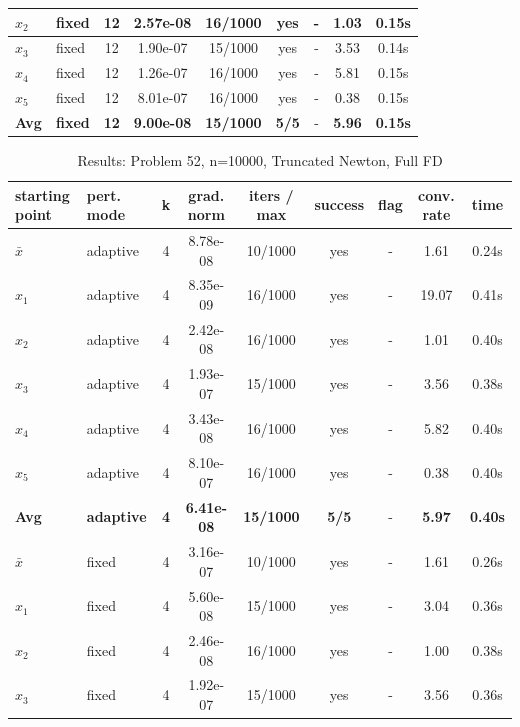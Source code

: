 \begin{longtable}{|l|l|c|c|c|c|c|c|c|}
\hline
$x_2$ & fixed & 12 & 2.57e-08 & 16/1000 & yes & - & 1.03 & 0.15s \\
\hline
$x_3$ & fixed & 12 & 1.90e-07 & 15/1000 & yes & - & 3.53 & 0.14s \\
\hline
$x_4$ & fixed & 12 & 1.26e-07 & 16/1000 & yes & - & 5.81 & 0.15s \\
\hline
$x_5$ & fixed & 12 & 8.01e-07 & 16/1000 & yes & - & 0.38 & 0.15s \\
\hline
\hline\hline
\textbf{Avg} & \textbf{fixed} & \textbf{12} & \textbf{9.00e-08} & \textbf{15/1000} & \textbf{5/5} & - & \textbf{5.96} & \textbf{0.15s} \\
\hline\hline
\end{longtable}


\begin{longtable}{|l|l|c|c|c|c|c|c|c|}
\caption{Results: Problem 52, n=10000, Truncated Newton, Full FD} \\
\hline
\textbf{starting point} & \textbf{pert. mode} & \textbf{k} & \textbf{grad. norm} & \textbf{iters / max} & \textbf{success} & \textbf{flag} & \textbf{conv. rate} & \textbf{time} \\
\hline
\endfirsthead
\endhead
\endfoot
\hline
\endlastfoot
$\bar{x}$ & adaptive & 4 & 8.78e-08 & 10/1000 & yes & - & 1.61 & 0.24s \\
\hline
$x_1$ & adaptive & 4 & 8.35e-09 & 16/1000 & yes & - & 19.07 & 0.41s \\
\hline
$x_2$ & adaptive & 4 & 2.42e-08 & 16/1000 & yes & - & 1.01 & 0.40s \\
\hline
$x_3$ & adaptive & 4 & 1.93e-07 & 15/1000 & yes & - & 3.56 & 0.38s \\
\hline
$x_4$ & adaptive & 4 & 3.43e-08 & 16/1000 & yes & - & 5.82 & 0.40s \\
\hline
$x_5$ & adaptive & 4 & 8.10e-07 & 16/1000 & yes & - & 0.38 & 0.40s \\
\hline
\hline\hline
\textbf{Avg} & \textbf{adaptive} & \textbf{4} & \textbf{6.41e-08} & \textbf{15/1000} & \textbf{5/5} & - & \textbf{5.97} & \textbf{0.40s} \\
\hline\hline
\hline
$\bar{x}$ & fixed & 4 & 3.16e-07 & 10/1000 & yes & - & 1.61 & 0.26s \\
\hline
$x_1$ & fixed & 4 & 5.60e-08 & 15/1000 & yes & - & 3.04 & 0.36s \\
\hline
$x_2$ & fixed & 4 & 2.46e-08 & 16/1000 & yes & - & 1.00 & 0.38s \\
\hline
$x_3$ & fixed & 4 & 1.92e-07 & 15/1000 & yes & - & 3.56 & 0.36s \\

\end{longtable}
